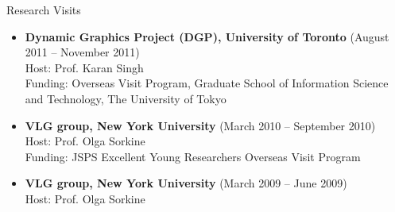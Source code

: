 {\Large\sc Research Visits}
\vspace{-3mm}
\begin{itemize}
\item {\bf Dynamic Graphics Project (DGP), University of Toronto} (August 2011 -- November 2011)\\
Host: Prof. Karan Singh\\
Funding: Overseas Visit Program, Graduate School of Information Science and Technology, The University of Tokyo
\item {\bf VLG group, New York University} (March 2010 -- September 2010)\\
Host: Prof. Olga Sorkine\\
Funding: JSPS Excellent Young Researchers Overseas Visit Program
\item {\bf VLG group, New York University} (March 2009 -- June 2009)\\
Host: Prof. Olga Sorkine
\end{itemize}
